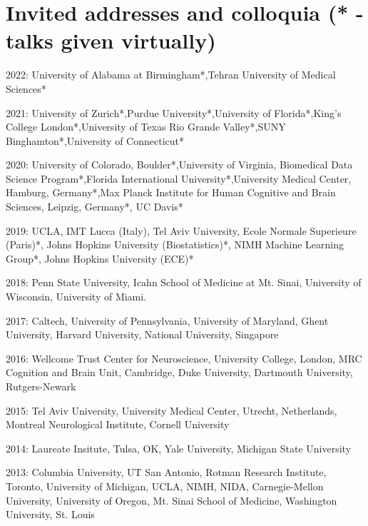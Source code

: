 \documentclass[10pt, letterpaper]{article}
\begin{document}
\section*{Invited addresses and colloquia (* - talks given virtually)}
\noindent

2022: University of Alabama at Birmingham*,Tehran University of Medical Sciences* \vspace{2mm}

2021: University of Zurich*,Purdue University*,University of Florida*,King's College London*,University of Texas Rio Grande Valley*,SUNY Binghamton*,University of Connecticut* \vspace{2mm}

2020: University of Colorado, Boulder*,University of Virginia, Biomedical Data Science Program*,Florida International University*,University Medical Center, Hamburg, Germany*,Max Planck Institute for Human Cognitive and Brain Sciences, Leipzig, Germany*, UC Davis* \vspace{2mm}

2019:  UCLA, IMT Lucca (Italy), Tel Aviv University, Ecole Normale Superieure (Paris)*, Johns Hopkins University (Biostatistics)*,  NIMH Machine Learning Group*, Johns Hopkins University (ECE)*  \vspace{2mm}

2018:  Penn State University, Icahn School of Medicine at Mt. Sinai, University of Wisconsin, University of Miami.  \vspace{2mm}

2017:  Caltech, University of Pennsylvania, University of Maryland, Ghent University, Harvard University, National University, Singapore  \vspace{2mm}

2016:  Wellcome Trust Center for Neuroscience, University College, London, MRC Cognition and Brain Unit, Cambridge, Duke University, Dartmouth University, Rutgers-Newark  \vspace{2mm}

2015:  Tel Aviv University, University Medical Center, Utrecht, Netherlands, Montreal Neurological Institute, Cornell University  \vspace{2mm}

2014:  Laureate Insitute, Tulsa, OK, Yale University, Michigan State University  \vspace{2mm}

2013:  Columbia University, UT San Antonio, Rotman Research Institute, Toronto, University of Michigan, UCLA, NIMH, NIDA, Carnegie-Mellon University, University of Oregon, Mt. Sinai School of Medicine, Washington University, St. Louis \vspace{2mm}
\end{document}
